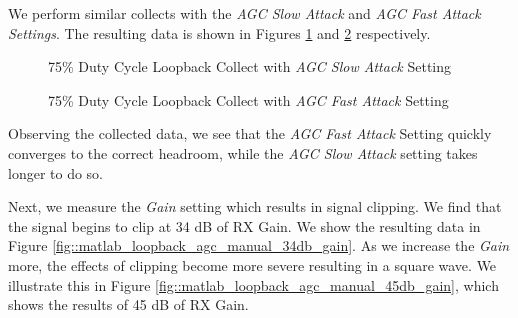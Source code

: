 \documentclass{article}
\begin{document}
We perform similar collects with the \textit{AGC Slow Attack} and \textit{AGC Fast Attack Settings}. The resulting data is shown in Figures \ref{fig::matlab_loopback_agc_slow_attack_75p_duty_cycle} and \ref{fig::matlab_loopback_agc_fast_attack_75p_duty_cycle} respectively.

\begin{figure}[H]
	\centerline{}
	\caption{75\% Duty Cycle Loopback Collect with \textit{AGC Slow Attack} Setting}
	\label{fig::matlab_loopback_agc_slow_attack_75p_duty_cycle}
\end{figure}

\begin{figure}[H]
	\centerline{}
	\caption{75\% Duty Cycle Loopback Collect with \textit{AGC Fast Attack} Setting}
	\label{fig::matlab_loopback_agc_fast_attack_75p_duty_cycle}
\end{figure}

Observing the collected data, we see that the \textit{AGC Fast Attack} Setting quickly converges to the correct headroom, while the 
\textit{AGC Slow Attack} setting takes longer to do so.

Next, we measure the \textit{Gain} setting which results in signal clipping. We find that the signal begins to clip at 34 dB of RX Gain. We show the resulting data in Figure \ref{fig::matlab_loopback_agc_manual_34db_gain}. As we increase the \textit{Gain} more, the effects of clipping become more severe resulting in a square wave. We illustrate this in Figure \ref{fig::matlab_loopback_agc_manual_45db_gain}, which shows the results of 45 dB of RX Gain.
\end{document}
